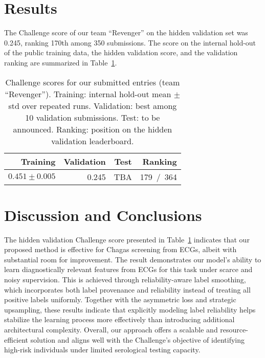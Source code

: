 \documentclass[twocolumn]{cinc}
\begin{document}
\section{Results}
\label{sec:results}


The Challenge score of our team ``Revenger'' on the hidden validation set was 0.245, ranking 170th among 350 submissions. The score on the internal hold-out of the public training data, the hidden validation score, and the validation ranking are summarized in Table~\ref{tab:scores}.

\begin{table}[!htp]
\centering
\begin{tabular}{r|r|r|r}
Training & Validation & Test & Ranking \\\hline
$0.451 \pm 0.005$ & 0.245 & TBA & 179~/~364 \\\hline
\end{tabular}
\caption{Challenge scores for our submitted entries (team ``Revenger''). Training: internal hold-out mean $\pm$ std over repeated runs. Validation: best among 10 validation submissions. Test: to be announced. Ranking: position on the hidden validation leaderboard.}
\label{tab:scores}
\end{table}


\section{Discussion and Conclusions}
\label{sec:discu}


The hidden validation Challenge score presented in Table~\ref{tab:scores} indicates that our proposed method is effective for Chagas screening from ECGs, albeit with substantial room for improvement. The result demonstrates our model's ability to learn diagnostically relevant features from ECGs for this task under scarce and noisy supervision. This is achieved through reliability-aware label smoothing, which incorporates both label provenance and reliability instead of treating all positive labels uniformly. Together with the asymmetric loss and strategic upsampling, these results indicate that explicitly modeling label reliability helps stabilize the learning process more effectively than introducing additional architectural complexity. Overall, our approach offers a scalable and resource-efficient solution and aligns well with the Challenge's objective of identifying high-risk individuals under limited serological testing capacity.
\end{document}
